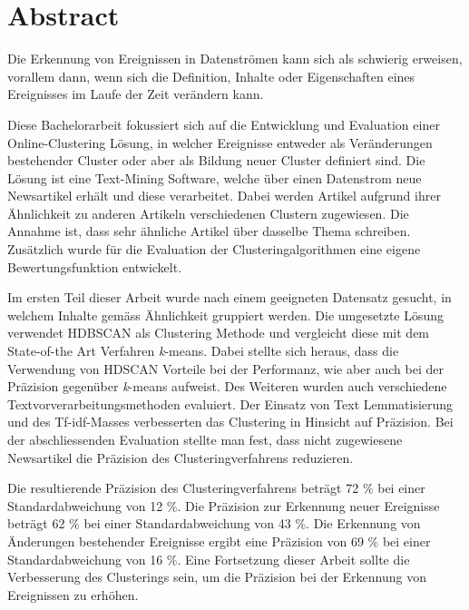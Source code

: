 
\section*{Abstract}

Die Erkennung von Ereignissen in Datenströmen kann sich als schwierig erweisen, vorallem dann,
wenn sich die Definition, Inhalte oder Eigenschaften eines Ereignisses im Laufe der Zeit verändern kann.

Diese Bachelorarbeit fokussiert sich auf die Entwicklung und Evaluation einer Online-Clustering Lösung,
in welcher Ereignisse entweder als Veränderungen bestehender Cluster oder aber als Bildung neuer Cluster
definiert sind.
Die Lösung ist eine Text-Mining Software, welche über einen Datenstrom neue Newsartikel erhält
und diese verarbeitet.
Dabei werden Artikel aufgrund ihrer Ähnlichkeit zu anderen Artikeln verschiedenen Clustern zugewiesen.
Die Annahme ist, dass sehr ähnliche Artikel über dasselbe Thema schreiben.
Zusätzlich wurde für die Evaluation der Clusteringalgorithmen eine eigene Bewertungsfunktion entwickelt.

Im ersten Teil dieser Arbeit wurde nach einem geeigneten Datensatz gesucht,
in welchem Inhalte gemäss Ähnlichkeit gruppiert werden.
Die umgesetzte Lösung verwendet HDBSCAN als Clustering Methode und vergleicht diese
mit dem State-of-the Art Verfahren \textit{k}-means.
Dabei stellte sich heraus, dass die Verwendung von HDSCAN Vorteile bei der Performanz,
wie aber auch bei der Präzision gegenüber \textit{k}-means aufweist.
Des Weiteren wurden auch verschiedene Textvorverarbeitungsmethoden evaluiert.
Der Einsatz von Text Lemmatisierung und des Tf-idf-Masses verbesserten
das Clustering in Hinsicht auf Präzision.
Bei der abschliessenden Evaluation stellte man fest,
dass nicht zugewiesene Newsartikel die Präzision des Clusteringverfahrens reduzieren.

Die resultierende Präzision des Clusteringverfahrens beträgt 72 \% bei einer Standardabweichung von 12 \%.
Die Präzision zur Erkennung neuer Ereignisse beträgt 62 \% bei einer Standardabweichung von 43 \%.
Die Erkennung von Änderungen bestehender Ereignisse ergibt eine
Präzision von 69 \% bei einer Standardabweichung von 16 \%.
Eine Fortsetzung dieser Arbeit sollte die Verbesserung des Clusterings sein,
um die Präzision bei der Erkennung von Ereignissen zu erhöhen.
